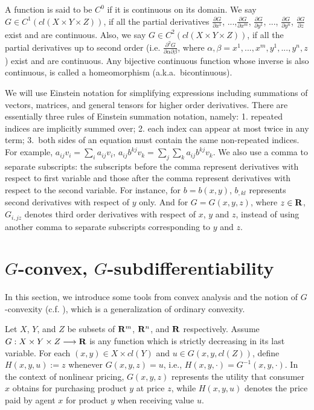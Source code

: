 A function is said to be $C^0$ if it is continuous on its domain. We say $G \in C^{1}(cl(X\times Y \times Z))$, if all the partial derivatives $\frac{\partial G}{\partial x^1}$, ...,$\frac{\partial G}{\partial x^m}$, $\frac{\partial G}{\partial y^1}$, ..., $\frac{\partial G}{\partial y^n}$, $\frac{\partial G}{\partial z}$ exist and are continuous. Also, we say $G \in C^{2}(cl(X\times Y \times Z))$, if all the partial derivatives up to second order (i.e. $\frac{\partial^2 G}{\partial \alpha \partial \beta}$, where $\alpha, \beta = x^1, ... , x^m, y^1, ..., y^n, z$) exist and are continuous. Any bijective continuous function whose inverse is also continuous, is called a homeomorphism (a.k.a.\ bicontinuous).
\medskip

We will use Einstein notation for simplifying expressions including summations of vectors, matrices, and general tensors for higher order derivatives. There are essentially three rules of Einstein summation notation, namely: 1. repeated indices are implicitly summed over; 2. each index can appear at most twice in any term; 3.~both sides of an equation must contain the same non-repeated indices. For example, $a_{ij}v_i =\sum_{i}a_{ij}v_i$, $a_{ij}b^{kj}v_k=\sum_{j}\sum_{k}a_{ij}b^{kj}v_k$. We also use a comma to separate subscripts: the subscripts before the comma represent derivatives with respect to first variable and those after the comma represent derivatives with respect to the second variable. For instance, for $b=b(x,y)$, $b_{,kl}$ represents second derivatives with respect of $y$ only. And for $G=G(x,y,z)$, where $z\in {\mathbf R}$, $G_{i,jz}$ denotes third order derivatives with respect of $x$, $y$ and $z$, instead of using another comma to separate subscripts corresponding to $y$ and $z$.\medskip


\section{$G$-convex, $G$-subdifferentiability}\label{section:G-convexity}
In this section, we introduce some tools from convex analysis and the notion of $G$-convexity  (c.f. \cite{Trudinger14,Balder77,Singer97}), which is a generalization of ordinary convexity. \medskip

Let $X$, $Y$, and $Z$ be subsets of ${\mathbf R}^m$, ${\mathbf R}^n$, and ${\mathbf R}$ respectively. Assume $G: X \times Y \times Z \longrightarrow {\mathbf R}$ is any function which is strictly decreasing in its last variable. For each $(x, y) \in X\times cl(Y)$ and $u\in G(x,y, cl(Z))$, define $H(x,y,u) := z$ whenever $G(x,y,z) = u$, i.e., $H(x, y, \cdot)= G^{-1}(x,y,\cdot)$. In the context of nonlinear pricing, $G(x,y,z)$ represents the utility that consumer $x$ obtains for purchasing product $y$ at price $z$, while $H(x,y,u)$ denotes the price paid by agent $x$ for product $y$ when receiving value $u$. \medskip


